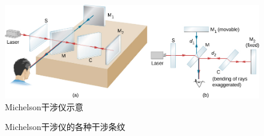 \documentclass{ctexart}
\begin{document}
\begin{figure}[ht]
    \centering
    \includegraphics[width=12cm]{src/MichInt.jpg}
    \caption{Michelson干涉仪示意}
\end{figure}
\begin{figure}[ht]
    \centering
    \begin{subfigure}{2cm}
        \centering
        \caption{}
    \end{subfigure}
    \begin{subfigure}{2cm}
        \centering
        \caption{}
    \end{subfigure}
    \begin{subfigure}{2cm}
        \centering
        \caption{}
    \end{subfigure}
    \begin{subfigure}{2cm}
        \centering
        \caption{}
    \end{subfigure}
    \begin{subfigure}{2cm}
        \centering
        \caption{}
    \end{subfigure}
        \begin{subfigure}{2cm}
        \centering
        \caption{}
    \end{subfigure}
    \begin{subfigure}{2cm}
        \centering
        \caption{}
    \end{subfigure}
    \begin{subfigure}{2cm}
        \centering
        \caption{}
    \end{subfigure}
    \begin{subfigure}{2cm}
        \centering
        \caption{}
    \end{subfigure}
    \begin{subfigure}{2cm}
        \centering
        \caption{}
    \end{subfigure}
    \caption{Michelson干涉仪的各种干涉条纹}
    \label{fig:Michelson干涉仪的各种干涉条纹}
\end{figure}
\end{document}
